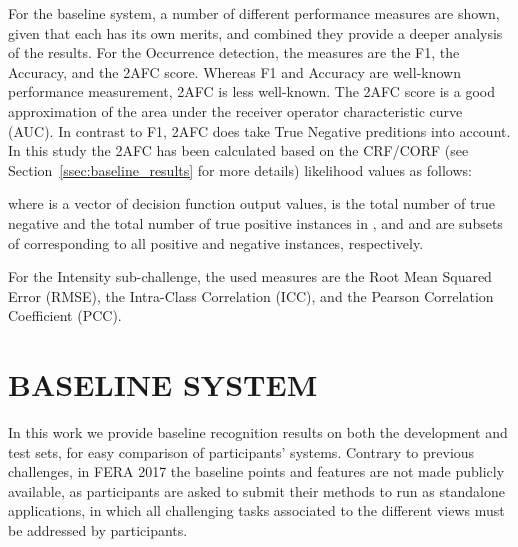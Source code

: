 \documentclass[a4paper, 10pt, conference]{ieeeconf}      \usepackage{FG2017}
\begin{document}
For the baseline system, a number of different performance measures are shown, given that each has its own merits, and combined they provide a deeper analysis of the results. For the Occurrence detection, the measures are the F1, the Accuracy, and the 2AFC score. Whereas F1 and Accuracy are well-known performance measurement, 2AFC is less well-known. The 2AFC score is a good approximation of the area under the receiver operator characteristic curve (AUC). In contrast to F1, 2AFC does take True Negative preditions into account. In this study the 2AFC has been calculated based on the CRF/CORF (see Section~\ref{ssec:baseline_results} for more details) likelihood values as follows:


where  is a vector of decision function output values,  is the total number of true negative and  the total number of true positive instances in , and  and  are subsets of  corresponding to all positive and negative instances, respectively. 

For the Intensity sub-challenge, the used measures are the Root Mean Squared Error (RMSE), the Intra-Class Correlation (ICC), and the Pearson Correlation Coefficient (PCC). 


\section{BASELINE SYSTEM}
\noindent In this work we provide baseline recognition results on both the development and test sets, for easy comparison of participants' systems. Contrary to previous challenges, in FERA 2017 the baseline points and features are not made publicly available, as participants are asked to submit their methods to run as standalone applications, in which all challenging tasks associated to the different views must be addressed by participants.
\end{document}
